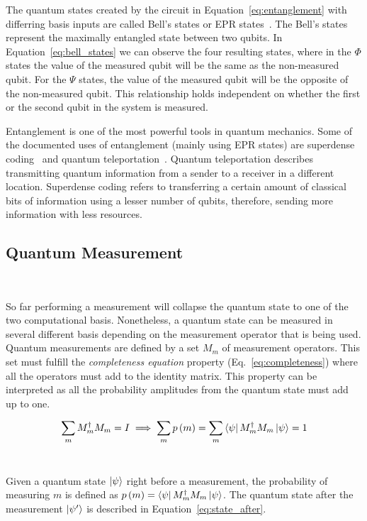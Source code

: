 The quantum states created by the circuit in Equation~\ref{eq:entanglement}
with differring basis inputs are called Bell's states or EPR
states~\cite{einstein_can_1935}. The Bell's states represent the maximally entangled
state between two qubits. In Equation~\ref{eq:bell_states} we can observe
the four resulting states, where in the \(\Phi\) states the value of the
measured qubit will be the same as the non-measured qubit. For the \(\Psi\)
states, the value of the measured qubit will be the opposite of the
non-measured qubit. This relationship holds independent on whether the
first or the second qubit in the system is measured. \

Entanglement is one of the most powerful tools in quantum mechanics.
Some of the documented uses of entanglement (mainly using EPR states)
are superdense coding~\cite{bennett_communication_1992} and quantum
teleportation~\cite{bennett_teleporting_1993}. Quantum teleportation
describes transmitting quantum information from
a sender to a receiver in a different location. Superdense coding refers
to transferring a certain amount of classical bits of information using
a lesser number of qubits, therefore, sending more information with less
resources. \

\subsection{Quantum Measurement}\label{subsection:measurement} \

So far performing a measurement will collapse the quantum state to
one of the two computational basis. Nonetheless, a quantum state
can be measured in several different basis depending on the
measurement operator that is being used. Quantum measurements
are defined by a set \(M_m\) of measurement operators. This
set must fulfill the \textit{completeness equation} property
(Eq.~\ref{eq:completeness}) where all the operators must add
to the identity matrix. This property can be interpreted as
all the probability amplitudes from the quantum state must
add up to one. \

\begin{equation}\label{eq:completeness}
    \sum_{m}M_m^{\dag}M_m = I 
    \implies \sum_{m}p\left(m\right) = \sum_{m}\bra{\psi}M_m^{\dag}M_m\ket{\psi} = 1
\end{equation} \

Given a quantum state \(\ket{\psi}\) right before a measurement, the
probability of measuring \(m\) is defined as
\(p\left(m\right) = \bra{\psi}M_m^{\dag}M_m\ket{\psi}\).
The quantum state after the measurement \(\ket{\psi'}\) is described in
Equation~\ref{eq:state_after}. \

